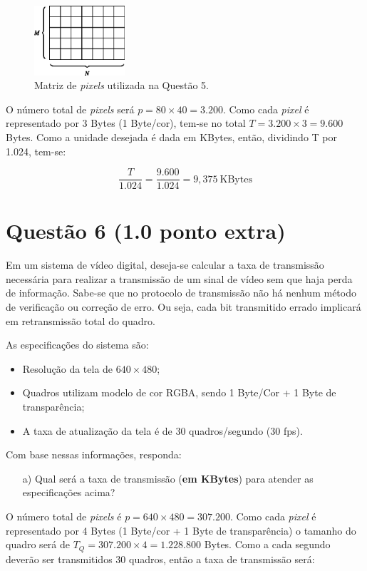 \documentclass[a4paper,11pt]{article}
\begin{document}
\begin{figure}[H]
\centering
\includegraphics[width=0.3\textwidth]{imgs/matriz}
\caption{Matriz de {\it pixels} utilizada na Questão 5.}
\label{fig:matriz}
\end{figure}

O número total de {\it pixels} será $p = 80 \times 40 = 3.200$. Como cada {\it
pixel} é representado por 3 Bytes (1 Byte/cor), tem-se no total $T = 3.200
\times 3 = 9.600$ Bytes. Como a unidade desejada é dada em KBytes, então,
dividindo T por 1.024, tem-se:

\[
\frac{T}{1.024} = \frac{9.600}{1.024} = 9,375\ \text{KBytes}
\]

\pagebreak

\section*{Questão 6 (1.0 ponto extra)}
Em um sistema de vídeo digital, deseja-se calcular a taxa de transmissão
necessária para realizar a transmissão de um sinal de vídeo sem que haja perda
de informação. Sabe-se que no protocolo de transmissão não há nenhum método de
verificação ou correção de erro. Ou seja, cada bit transmitido errado implicará
em retransmissão total do quadro. 

As especificações do sistema são:

\begin{itemize}
\item Resolução da tela de $640 \times 480$;
\item Quadros utilizam modelo de cor RGBA, sendo 1 Byte/Cor + 1 Byte de
transparência;
\item A taxa de atualização da tela é de 30 quadros/segundo (30 fps).
\end{itemize}

Com base nessas informações, responda:

\begin{itemize}
    \item [a)] Qual será a taxa de transmissão ({\bf em KBytes}) para atender as
especificações acima?
\end{itemize}

O número total de {\it pixels} é $p = 640 \times 480 = 307.200$. Como cada {\it
pixel} é representado por 4 Bytes (1 Byte/cor + 1 Byte de transparência) o
tamanho do quadro será de $T_Q = 307.200 \times 4 = 1.228.800$ Bytes. Como a cada
segundo deverão ser transmitidos 30 quadros, então a taxa de transmissão será:
\end{document}
